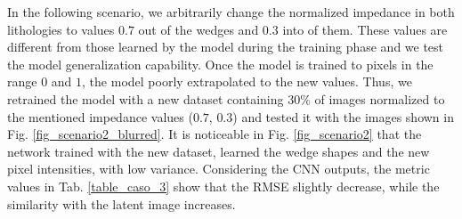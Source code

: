 \documentclass[conference]{IEEEtran}
\begin{document}
In the following scenario, we arbitrarily change the normalized impedance in both
lithologies to values $ 0.7 $ out of the wedges and $ 0.3$ into of them.
These values are different from those learned by the model during the
training phase and we test the model generalization capability. Once the model is trained to pixels in the range
$ 0 $ and $ 1 $, the model poorly extrapolated to the new values. Thus, we retrained the model with a new dataset containing $30\%$
of images normalized to the mentioned impedance values ($0.7$, $0.3$) and tested it with the images shown in Fig. \ref{fig_scenario2_blurred}. It is noticeable in Fig. \ref{fig_scenario2} that the network trained with the new dataset, learned
the wedge shapes and the new pixel intensities, with low variance. Considering the CNN outputs, the metric values in Tab. \ref{table_caso_3}
show that the RMSE slightly decrease, while the similarity with the latent image increases.
\end{document}
